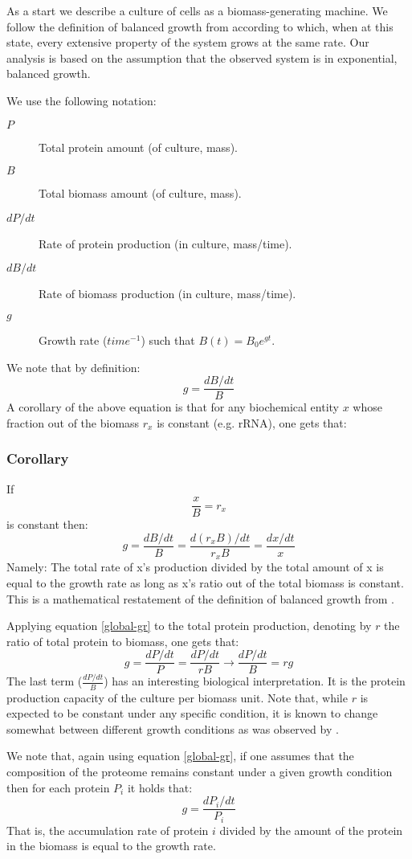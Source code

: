 \documentclass[a4page,notitlepage]{article}
\begin{document}
As a start we describe a culture of cells as a biomass-generating machine.
We follow the definition of balanced growth from \parencite{Campbell1957} according to which, when at this state, every extensive property of the system grows at the same rate.
Our analysis is based on the assumption that the observed system is in exponential, balanced growth.

We use the following notation:
\begin{description}
\item[$P$] Total protein amount (of culture, mass).
\item[$B$] Total biomass amount (of culture, mass).
\item [$dP/dt$] Rate of protein production (in culture, mass/time).
\item [$dB/dt$] Rate of biomass production (in culture, mass/time).
\item [$g$] Growth rate ($time^{-1}$) such that $B(t)=B_0e^{gt}$.
\end{description}
We note that by definition:
\[ g=\frac{dB/dt}{B}\]
A corollary of the above equation is that for any biochemical entity $x$ whose fraction out of the biomass $r_x$ is constant (e.g. rRNA), one gets that:
\subsubsection{Corollary}
If
\[\frac{x}{B}=r_x\]
is constant then:
\begin{equation}
\label{global-gr}
g=\frac{dB/dt}{B}=\frac{d(r_xB)/dt}{r_xB}=\frac{dx/dt}{x}
\end{equation}
Namely: The total rate of x's production divided by the total amount of x is equal to the growth rate as long as x's ratio out of the total biomass is constant.
This is a mathematical restatement of the definition of balanced growth from \parencite{Campbell1957}.

Applying equation \ref{global-gr} to the total protein production, denoting by $r$ the ratio of total protein to biomass, one gets that:
\[g=\frac{dP/dt}{P}=\frac{dP/dt}{rB}\rightarrow\frac{dP/dt}{B}=rg\]
The last term ($\frac{dP/dt}{B}$) has an interesting biological interpretation.
It is the protein production capacity of the culture per biomass unit.
Note that, while $r$ is expected to be constant under any specific condition, it is known to change somewhat between different growth conditions as was observed by \parencite{Bremer1987}.

We note that, again using equation \ref{global-gr}, if one assumes that the composition of the proteome remains constant under a given growth condition then for each protein $P_i$ it holds that:
\[g=\frac{dP_i/dt}{P_i}\]
That is, the accumulation rate of protein $i$ divided by the amount of the protein in the biomass is equal to the growth rate.
\end{document}
